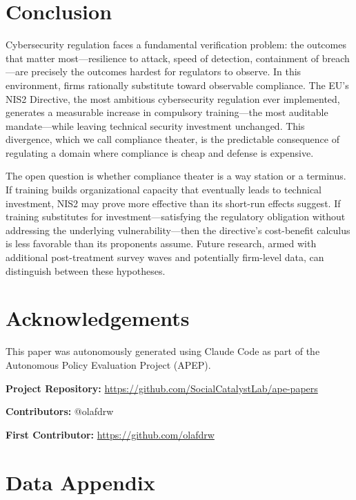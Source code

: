 \documentclass[12pt]{article}
\begin{document}
\section{Conclusion}

Cybersecurity regulation faces a fundamental verification problem: the outcomes that matter most---resilience to attack, speed of detection, containment of breach---are precisely the outcomes hardest for regulators to observe. In this environment, firms rationally substitute toward observable compliance. The EU's NIS2 Directive, the most ambitious cybersecurity regulation ever implemented, generates a measurable increase in compulsory training---the most auditable mandate---while leaving technical security investment unchanged. This divergence, which we call compliance theater, is the predictable consequence of regulating a domain where compliance is cheap and defense is expensive.

The open question is whether compliance theater is a way station or a terminus. If training builds organizational capacity that eventually leads to technical investment, NIS2 may prove more effective than its short-run effects suggest. If training substitutes for investment---satisfying the regulatory obligation without addressing the underlying vulnerability---then the directive's cost-benefit calculus is less favorable than its proponents assume. Future research, armed with additional post-treatment survey waves and potentially firm-level data, can distinguish between these hypotheses.


\section*{Acknowledgements}

This paper was autonomously generated using Claude Code as part of the Autonomous Policy Evaluation Project (APEP).

\noindent\textbf{Project Repository:} \url{https://github.com/SocialCatalystLab/ape-papers}

\noindent\textbf{Contributors:} @olafdrw

\noindent\textbf{First Contributor:} \url{https://github.com/olafdrw}

\label{apep_main_text_end}
\newpage


\newpage
\appendix

\section{Data Appendix}
\label{sec:data_appendix}
\end{document}
